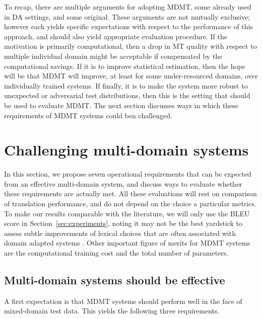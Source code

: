 \documentclass[11pt,a4paper]{article}
\newcommand{\fyDone}[1]{\done[FY]\Todo[FY:]{\textcolor{orange}{#1}}}
\begin{document}
\fyDone{recap}
To recap, there are multiple arguments for adopting MDMT, some already used in DA settings, and some original. These arguments are not mutually exclusive; however each yields specific expectations with respect to the performance of this approach, and should also yield appropriate evaluation procedure. If the motivation is primarily computational, then a drop in MT quality with respect to multiple individual domain might be acceptable if compensated by the computational savings. If it is to improve statistical estimation, then the hope will be that MDMT will improve, at least for some under-resourced domains, over individually trained systems. If finally, it is to make the system more robust to unexpected or adversarial test distributions, then this is the setting that should be used to evaluate MDMT. The next section discusses ways in which these requirements of MDMT systems could ben challenged. 

\section{Challenging multi-domain systems \label{sec:challenging}}
In this section, we propose seven\fyDone{check number} operational requirements that can be expected from an effective multi-domain system, and discuss ways to evaluate whether these requirements are actually met. All these evaluations will rest on comparison of translation performance, and do not depend on the choice a particular metrics. To make our results comparable with the literature, we will only use the BLEU score \cite{Papineni02bleu} in Section~\ref{sec:experiments}, noting it may not be the best yardstick to assess subtle improvements of lexical choices that are often associated with domain adapted systems \cite{Irvine13measuring}. Other important figure of merits for MDMT systems are the computational training cost and the total number of parameters.\fyDone{Insert discussion about scores}

\subsection{Multi-domain systems should be effective \label{ssec:effective}}
A first expectation is that MDMT systems should perform well in the face of mixed-domain test data. This yields the following three requirements.
\end{document}

